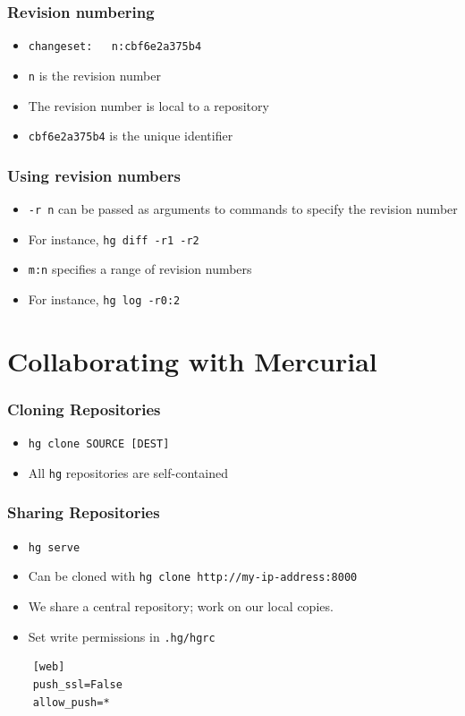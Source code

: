 \documentclass[14pt,compress]{beamer}
\newcommand{\typ}[1]{\lstinline{#1}}
\begin{document}
\begin{frame}[fragile]
  \frametitle{Revision numbering}
  \begin{itemize}
  \item \typ{changeset:   n:cbf6e2a375b4}
  \item \typ{n} is the revision number
  \item The revision number is local to a repository
  \item \typ{cbf6e2a375b4} is the unique identifier
  \end{itemize}
\end{frame}

\begin{frame}[fragile]
  \frametitle{Using revision numbers}
  \begin{itemize}
  \item \typ{-r n} can be passed as arguments to commands to specify
    the revision number
  \item For instance, \typ{hg diff -r1 -r2}
  \item \typ{m:n} specifies a range of revision numbers
  \item For instance, \typ{hg log -r0:2}
  \end{itemize}
\end{frame}

\section{Collaborating with Mercurial}
\begin{frame}[fragile]
  \frametitle{Cloning Repositories}
  \begin{itemize}
  \item \typ{hg clone SOURCE [DEST]}
  \item All \typ{hg} repositories are self-contained
  \end{itemize}
\end{frame}

\begin{frame}[fragile]
  \frametitle{Sharing Repositories}
  \begin{itemize}
  \item \typ{hg serve}
  \item Can be cloned with \typ{hg clone http://my-ip-address:8000}
  \item We share a central repository; work on our local copies.
  \item Set write permissions in \typ{.hg/hgrc}
  \end{itemize}
  \begin{lstlisting}
    [web]
    push_ssl=False
    allow_push=*
  \end{lstlisting}
\end{frame}
\end{document}
